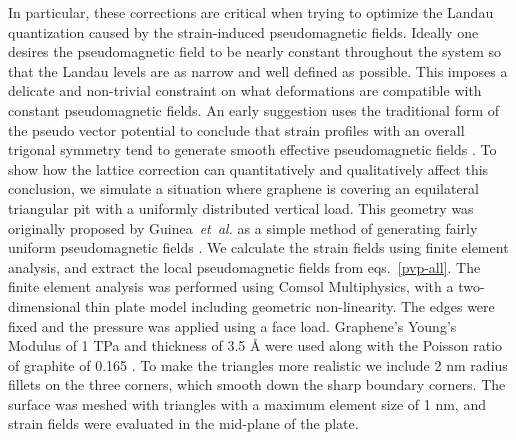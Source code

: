 In particular, these corrections are critical when trying to optimize the Landau quantization caused by the strain-induced pseudomagnetic fields.
Ideally one desires the pseudomagnetic field to be nearly constant throughout the system so that the Landau levels are as narrow and well defined as possible.
This imposes a delicate and non-trivial constraint on what deformations are compatible with constant pseudomagnetic fields.
An early suggestion uses the traditional form of the pseudo vector potential to conclude that strain profiles with an overall trigonal symmetry tend to generate smooth effective pseudomagnetic fields \cite{Guinea2009}.
To show how the lattice correction can quantitatively and qualitatively affect this conclusion, we simulate a situation where graphene is covering an equilateral triangular pit with a uniformly distributed vertical load.
This geometry was originally proposed by Guinea~\emph{et~al.} as a simple method of generating fairly uniform pseudomagnetic fields \cite{Guinea2009}.
We calculate the strain fields using finite element analysis, and extract the local pseudomagnetic fields from eqs.~\eqref{pvp-all}.
The finite element analysis was performed using Comsol Multiphysics, with a two-dimensional thin plate model including geometric non-linearity.
The edges were fixed and the pressure was applied using a face load.
Graphene's Young's Modulus of 1 TPa and thickness of 3.5 \AA \cite{Lee2008} were used along with the Poisson ratio of graphite of 0.165 \cite{Blakslee1970}.
To make the triangles more realistic we include 2 nm radius fillets on the three corners, which smooth down the sharp boundary corners.
The surface was meshed with triangles with a maximum element size of 1 nm, and strain fields were evaluated in the mid-plane of the plate.

